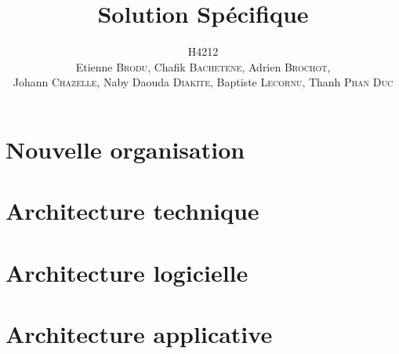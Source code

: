 \documentclass[a4paper,11pt]{article}
\title{Solution Spécifique}
\author{H4212\\Etienne \textsc{Brodu}, Chafik \textsc{Bachetene}, Adrien \textsc{Brochot},\\Johann \textsc{Chazelle}, Naby Daouda \textsc{Diakite}, Baptiste \textsc{Lecornu}, Thanh \textsc{Phan Duc}}
\begin{document}
\maketitle
\newpage

\tableofcontents
\newpage

\part{Nouvelle organisation}
    
    
\part{Architecture technique}
	

\part{Architecture logicielle}
    

\part{Architecture applicative}
    
\end{document}
